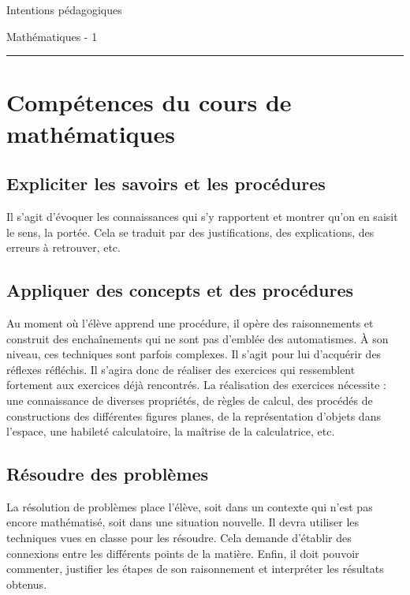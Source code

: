 \documentclass[parskip=half-, numbers=enddot]{scrartcl}
\begin{document}
\begin{center}
  \bfseries
  \begin{Huge}
    Intentions pédagogiques
  \end{Huge}
  \smallbreak
  \begin{Large}
    Mathématiques - 1\iere
  \end{Large}
  \smallbreak
  \rule[10pt]{.3\linewidth}{1 pt}
\end{center}
\section{Compétences du cours de mathématiques}

\subsection{Expliciter les savoirs et les procédures}

Il s'agit d'évoquer les connaissances qui s'y rapportent et montrer
qu'on en saisit le sens, la portée. Cela se traduit par des
justifications, des explications, des erreurs à retrouver, etc.

\subsection{Appliquer des concepts et des procédures}

Au moment où l'élève apprend une procédure, il opère des raisonnements
et construit des enchaînements qui ne sont pas d'emblée des
automatismes. À son niveau, ces techniques sont parfois complexes. Il
s'agit pour lui d'acquérir des réflexes réfléchis. Il s'agira donc de
réaliser des exercices qui ressemblent fortement aux exercices déjà
rencontrés. La réalisation des exercices nécessite : une connaissance de
diverses propriétés, de règles de calcul, des procédés de constructions
des différentes figures planes, de la représentation d'objets dans
l'espace, une habileté calculatoire, la maîtrise de la
calculatrice, etc.

\subsection{Résoudre des problèmes}

La résolution de problèmes place l'élève, soit dans un contexte qui
n'est pas encore mathématisé, soit dans une situation nouvelle. Il devra
utiliser les techniques vues en classe pour les résoudre. Cela demande
d'établir des connexions entre les différents points de la matière.
Enfin, il doit pouvoir commenter, justifier les étapes de son
raisonnement et interpréter les résultats obtenus.
\end{document}

